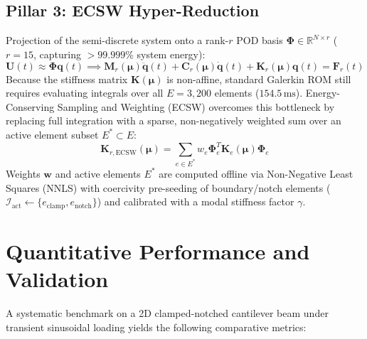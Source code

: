 \documentclass[11pt,a4paper]{article}
\newcommand{\vect}[1]{\mathbf{#1}}
\begin{document}
\subsection{Pillar 3: ECSW Hyper-Reduction}
Projection of the semi-discrete system onto a rank-$r$ POD basis $\boldsymbol{\Phi} \in \mathbb{R}^{N \times r}$ ($r=15$, capturing $>99.999\%$ system energy):
\begin{equation}
    \vect{U}(t) \approx \boldsymbol{\Phi} \vect{q}(t) \implies \mathbf{M}_r(\boldsymbol{\mu}) \ddot{\vect{q}}(t) + \mathbf{C}_r(\boldsymbol{\mu}) \dot{\vect{q}}(t) + \mathbf{K}_r(\boldsymbol{\mu}) \vect{q}(t) = \mathbf{F}_r(t)
\end{equation}
Because the stiffness matrix $\mathbf{K}(\boldsymbol{\mu})$ is non-affine, standard Galerkin ROM still requires evaluating integrals over all $E = 3,200$ elements ($154.5\,\text{ms}$). Energy-Conserving Sampling and Weighting (ECSW) overcomes this bottleneck by replacing full integration with a sparse, non-negatively weighted sum over an active element subset $E^* \subset E$:
\begin{equation}
    \mathbf{K}_{r, \text{ECSW}}(\boldsymbol{\mu}) = \sum_{e \in E^*} w_e \boldsymbol{\Phi}_e^T \mathbf{K}_e(\boldsymbol{\mu}) \boldsymbol{\Phi}_e
\end{equation}
Weights $\vect{w}$ and active elements $E^*$ are computed offline via Non-Negative Least Squares (NNLS) with coercivity pre-seeding of boundary/notch elements ($\mathcal{I}_{\text{act}} \gets \{e_{\text{clamp}}, e_{\text{notch}}\}$) and calibrated with a modal stiffness factor $\gamma$.

\section{Quantitative Performance and Validation}
A systematic benchmark on a 2D clamped-notched cantilever beam under transient sinusoidal loading yields the following comparative metrics:
\end{document}
